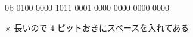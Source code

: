 \correct
\begin{center}
0b 0100	0000 1011 0001 0000 0000 0000 0000

\noindent ※ 長いので 4 ビットおきにスペースを入れてある
\end{center}
